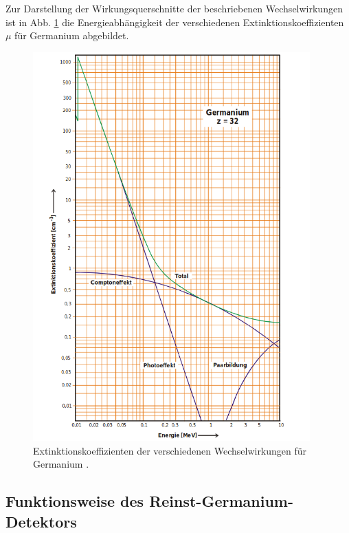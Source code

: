     Zur Darstellung der Wirkungsquerschnitte der beschriebenen Wechselwirkungen ist in Abb. \ref{fig:mu_koeff}
    die Energieabhängigkeit der verschiedenen Extinktionskoeffizienten $\mu$ für Germanium abgebildet.
    \begin{figure}
      \centering
      \includegraphics[width=0.95\textwidth]{mu_koeff.png}
      \caption{Extinktionskoeffizienten der verschiedenen Wechselwirkungen für Germanium \cite{anleitungv18}.}
      \label{fig:mu_koeff}
    \end{figure}

    \subsection{Funktionsweise des Reinst-Germanium-Detektors}

